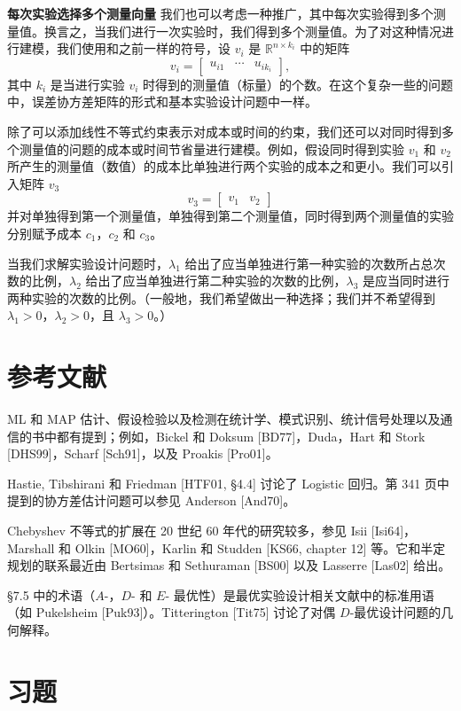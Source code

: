 \documentclass[UTF8,12pt,a4paper,fontset=fandol]{ctexart}
\begin{document}
\noindent\textbf{每次实验选择多个测量向量}\quad
我们也可以考虑一种推广，其中每次实验得到多个测量值。换言之，当我们进行一次实验时，我们得到多个测量值。为了对这种情况进行建模，我们使用和之前一样的符号，设 $v_i$ 是 $\mathbb{R}^{n\times k_i}$ 中的矩阵
\[
v_i=\begin{bmatrix}u_{i1}&\cdots&u_{ik_i}\end{bmatrix},
\]
其中 $k_i$ 是当进行实验 $v_i$ 时得到的测量值（标量）的个数。在这个复杂一些的问题中，误差协方差矩阵的形式和基本实验设计问题中一样。

除了可以添加线性不等式约束表示对成本或时间的约束，我们还可以对同时得到多个测量值的问题的成本或时间节省量进行建模。例如，假设同时得到实验 $v_1$ 和 $v_2$ 所产生的测量值（数值）的成本比单独进行两个实验的成本之和更小。我们可以引入矩阵 $v_3$
\[
v_3=\begin{bmatrix}v_1&v_2\end{bmatrix}
\]
并对单独得到第一个测量值，单独得到第二个测量值，同时得到两个测量值的实验分别赋予成本 $c_1$，$c_2$ 和 $c_3$。

当我们求解实验设计问题时，$\lambda_1$ 给出了应当单独进行第一种实验的次数所占总次数的比例，$\lambda_2$ 给出了应当单独进行第二种实验的次数的比例，$\lambda_3$ 是应当同时进行两种实验的次数的比例。（一般地，我们希望做出一种选择；我们并不希望得到 $\lambda_1>0$，$\lambda_2>0$，且 $\lambda_3>0$。）

\section*{参考文献}

ML 和 MAP 估计、假设检验以及检测在统计学、模式识别、统计信号处理以及通信的书中都有提到；例如，Bickel 和 Doksum [BD77]，Duda，Hart 和 Stork [DHS99]，Scharf [Sch91]，以及 Proakis [Pro01]。

Hastie, Tibshirani 和 Friedman [HTF01, \S4.4] 讨论了 Logistic 回归。第 341 页中提到的协方差估计问题可以参见 Anderson [And70]。

Chebyshev 不等式的扩展在 20 世纪 60 年代的研究较多，参见 Isii [Isi64]，Marshall 和 Olkin [MO60]，Karlin 和 Studden [KS66, chapter 12] 等。它和半定规划的联系最近由 Bertsimas 和 Sethuraman [BS00] 以及 Lasserre [Las02] 给出。

\S7.5 中的术语（$A$-，$D$- 和 $E$- 最优性）是最优实验设计相关文献中的标准用语（如 Pukelsheim [Puk93]）。Titterington [Tit75] 讨论了对偶 $D$-最优设计问题的几何解释。

\section*{习题}
\end{document}
